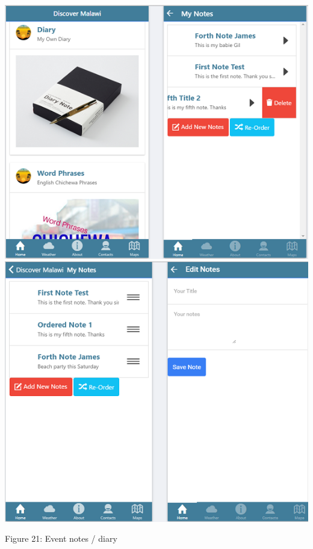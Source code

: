 \begin{center}    
	\includegraphics{img/diary.png}
	\includegraphics{img/diary3.png}
\end{center}
\begin{center}
	Figure 21: Event notes / diary 
\end{center}
\paragraph{}

